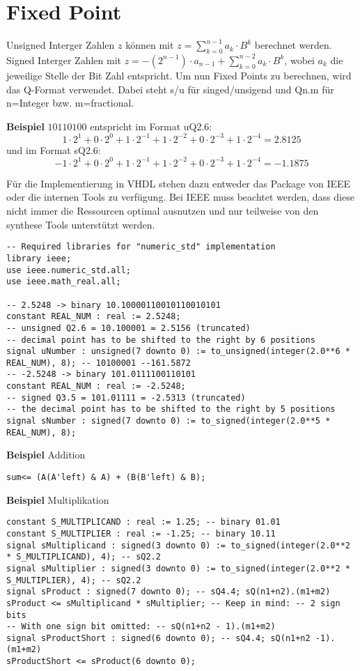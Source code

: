 \section{Fixed Point}
Unsigned Interger Zahlen $z$ können mit $z=\sum_{k=0}^{n-1}a_k\cdot B^k$ berechnet werden. Signed Interger Zahlen mit $z=-(2^{n-1})\cdot a_{n-1}+\sum_{k=0}^{n-2}a_k\cdot B^k$, wobei $a_k$ die jeweilige Stelle der Bit Zahl entspricht. Um nun Fixed Points zu berechnen, wird das Q-Format verwendet. Dabei steht s/u für singed/unsigend und Qn.m für n=Integer bzw. m=fractional.

\textbf{Beispiel} $10110100$ entspricht im Format uQ2.6:
\[
1\cdot 2^1 + 0\cdot2^0 + 1\cdot2^{-1}+ 1\cdot2^{-2}+ 0\cdot2^{-3}+ 1\cdot2^{-4} = 2.8125
\]
und im Format sQ2.6:
\[
-1\cdot 2^1 + 0\cdot2^0 + 1\cdot2^{-1}+ 1\cdot2^{-2}+ 0\cdot2^{-3}+ 1\cdot2^{-4} = -1.1875
\]

Für die Implementierung in VHDL stehen dazu entweder das Package von IEEE oder die internen Tools zu verfügung. Bei IEEE muss beachtet werden, dass diese nicht immer die Ressourcen optimal ausnutzen und nur teilweise von den synthese Tools unterstützt werden.

\begin{lstlisting}
-- Required libraries for "numeric_std" implementation
library ieee;
use ieee.numeric_std.all;
use ieee.math_real.all;

-- 2.5248 -> binary 10.10000110010110010101
constant REAL_NUM : real := 2.5248;
-- unsigned Q2.6 = 10.100001 = 2.5156 (truncated)
-- decimal point has to be shifted to the right by 6 positions
signal uNumber : unsigned(7 downto 0) := to_unsigned(integer(2.0**6 * REAL_NUM), 8); -- 10100001 --161.5872
-- -2.5248 -> binary 101.0111100110101
constant REAL_NUM : real := -2.5248;
-- signed Q3.5 = 101.01111 = -2.5313 (truncated)
-- the decimal point has to be shifted to the right by 5 positions
signal sNumber : signed(7 downto 0) := to_signed(integer(2.0**5 * REAL_NUM), 8);
\end{lstlisting}


\textbf{Beispiel} Addition
\begin{lstlisting}
sum<= (A(A'left) & A) + (B(B'left) & B);
\end{lstlisting}




\textbf{Beispiel} Multiplikation
\begin{lstlisting}
constant S_MULTIPLICAND : real := 1.25; -- binary 01.01
constant S_MULTIPLIER : real := -1.25; -- binary 10.11
signal sMultiplicand : signed(3 downto 0) := to_signed(integer(2.0**2 * S_MULTIPLICAND), 4); -- sQ2.2
signal sMultiplier : signed(3 downto 0) := to_signed(integer(2.0**2 * S_MULTIPLIER), 4); -- sQ2.2
signal sProduct : signed(7 downto 0); -- sQ4.4; sQ(n1+n2).(m1+m2)
sProduct <= sMultiplicand * sMultiplier; -- Keep in mind: -- 2 sign bits
-- With one sign bit omitted: -- sQ(n1+n2 - 1).(m1+m2)
signal sProductShort : signed(6 downto 0); -- sQ4.4; sQ(n1+n2 -1).(m1+m2)
sProductShort <= sProduct(6 downto 0);
\end{lstlisting}


